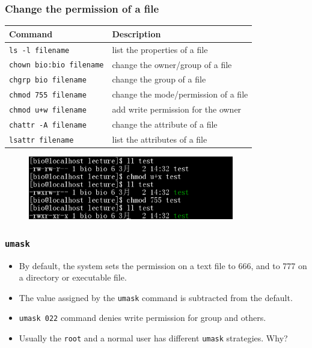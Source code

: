\documentclass[red]{beamer}
\begin{document}
\begin{CJK*}{UTF8}{gbsn}
\begin{frame}
\frametitle{Change the permission of a file}
\begin{table}[ht]
\scriptsize
\renewcommand\arraystretch{1.6}
\begin{tabular}{ll}
\hline
\textbf{Command} & \textbf{Description}\\
\hline
\texttt{ls -l filename} & list the properties of a file\\
\texttt{chown bio:bio filename} & change the owner/group of a file\\
\texttt{chgrp bio filename} & change the group of a file\\
\texttt{chmod 755 filename} & change the mode/permission of a file\\
\texttt{chmod u+w filename} & add write permission for the owner\\
\texttt{chattr -A filename} & change the attribute of a file\\
\texttt{lsattr filename} & list the attributes of a file\\
\hline
\end{tabular}
\end{table}
\begin{figure}[ht]
\includegraphics[width=0.80\textwidth]{images/chmod.png}
\end{figure}
\end{frame}

\begin{frame}[containsverbatim]
\frametitle{\texttt{umask}}
\begin{itemize}
	\item By default, the system sets the permission on a text file 
		to 666, and to 777 on a directory or executable file.
	\item The value assigned by the \lstinline{umask} command is 
		subtracted from the default.
	\item \lstinline{umask 022} command denies write permission for 
		group and others.
	\item Usually the \texttt{root} and a normal user has different 
		\lstinline{umask} strategies. Why?
\end{itemize}
\end{frame}


\end{CJK*}
\end{document}
